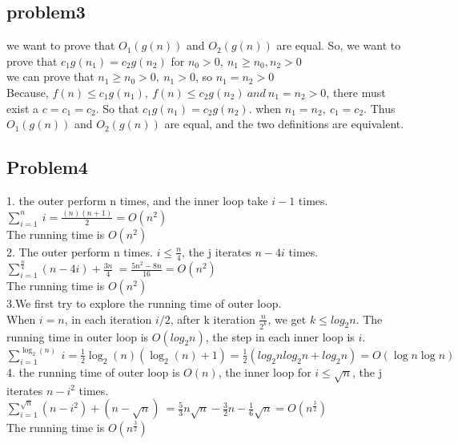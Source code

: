 \documentclass[11pt]{article}
\begin{document}
\subsection{problem3}
we want to prove that $O_1(g(n))$ and $O_2(g(n))$ are equal. So, we want to prove that $c_1g(n_1)=c_2g(n_2)$ for $n_0> 0, \ n_1\geq n_0, n_2> 0$
\\we can prove that $n_1\geq n_0>0,  \ n_1>0$, so $n_1=n_2>0$
\\Because, $f(n)\leq c_1g(n_1), \ f(n) \leq c_2g(n_2) \ and \ n_1=n_2>0$, there must exist a $c=c_1=c_2$. So that $c_1g(n_1)=c_2g(n_2)$. when $n_1=n_2, \ c_1=c_2$. Thus $O_1(g(n))$ and $O_2(g(n))$ are equal, and the  two definitions are equivalent.
 

\subsection{Problem4}
1. the outer perform n times, and the inner loop take $i-1$ times. $\sum _{i=1}^n\:i=\frac{(n)(n+1)}{2}=O(n^2)$
\\The running time is $O(n^2)$
\\2. The outer perform n times. $i\leq\frac{n}{4}$, the j iterates $n-4i$ times. $\sum _{i=1}^{\frac{n}{4}}\left(n-4i\right)+\frac{3n}{4}\:=\frac{5n^2-8n}{16}=O(n^2)$ 
\\The running time is $O(n^2)$
\\3.We first try to explore the running time of outer loop.
\\When $i=n$, in each iteration $i/2$, after k iteration $\frac{n}{2^k}$, we get $k\leq log_2n$. The running time in outer loop is $O(log_2 n)$, the step in each inner loop is $i$. \\$\sum _{i=1}^{\log _2\left(n\right)}\:i=\frac{1}{2}\log _2\left(n\right)\left(\log _2\left(n\right)+1\right)=\frac{1}{2}(log_2nlog_2n+log_2n)=O(\log n \log n)$
\\4. the running time of outer loop is $O(n)$, the inner loop for $i\leq \sqrt{n}$, the j iterates $n-i^2$ times. 
\\$\sum _{i=1}^{\sqrt{n}}\left(n-i^2\right)+\left(n-\sqrt{n}\right)\:=\frac{5}{3}n\sqrt{n}-\frac{3}{2}n-\frac{1}{6}\sqrt{n}=O(n^{\frac{3}{2}})$
\\The running time is $O(n^{\frac{3}{2}})$
\end{document}
